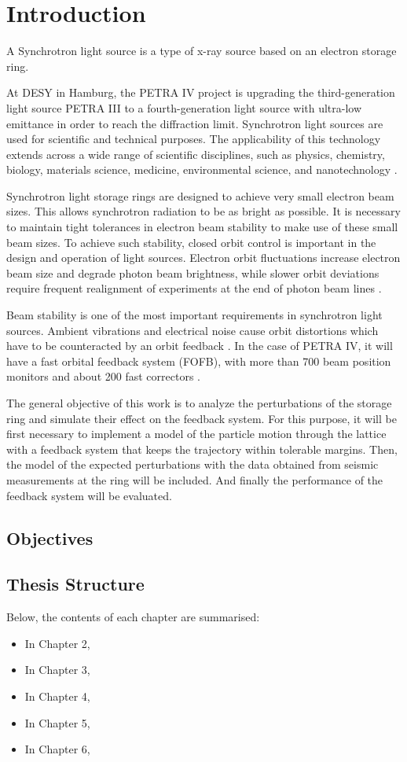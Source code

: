 \chapter{Introduction}
\label{cha:Introduction}

A Synchrotron light source is a type of x-ray source based on an electron storage ring.

At DESY in Hamburg, the PETRA IV project is upgrading the third-generation light source PETRA III to a fourth-generation light source  with ultra-low emittance in order to reach the diffraction limit. Synchrotron light sources  are used for scientific and technical purposes. The applicability of this technology extends  across a wide range of scientific disciplines, such as physics, chemistry, biology, materials  science, medicine, environmental science, and nanotechnology \cite{Schroer:426140}. 

Synchrotron light storage rings are designed to achieve very small electron beam sizes. This 
allows synchrotron radiation to be as bright as possible. It is necessary to maintain tight 
tolerances in electron beam stability to make use of these small beam sizes. To achieve 
such stability, closed orbit control is important in the design and operation of light sources. 
Electron orbit fluctuations increase electron beam size and degrade photon beam brightness, while slower orbit deviations require frequent realignment of experiments at the end of photon beam lines \cite{Safranek:1999fr}. 

Beam stability is one of the most important requirements in synchrotron light sources. Ambient vibrations and electrical noise cause orbit distortions which have to be counteracted 
by an orbit feedback \cite{sahoo2004closed}. In the case of PETRA IV, it will have a fast orbital feedback system (FOFB), with more than 700 beam position monitors and about 200 fast correctors \cite{Schroer:426140}.

The general objective of this work is to analyze the perturbations of the storage ring and simulate their effect on the feedback system.
For this purpose, it will be first necessary to implement a model of the particle motion through the lattice with a  feedback system that keeps the trajectory within tolerable margins. Then, the model of the expected perturbations with the data obtained from seismic measurements at the ring will be included. And finally the performance of the feedback system will be evaluated.

\section{Objectives}

\section{Thesis Structure}
Below, the contents of each chapter are summarised:

\begin{itemize}
    \item In Chapter 2, 
    \item In Chapter 3,
    \item In Chapter 4,
    \item In Chapter 5, 
    \item In Chapter 6,
\end{itemize}